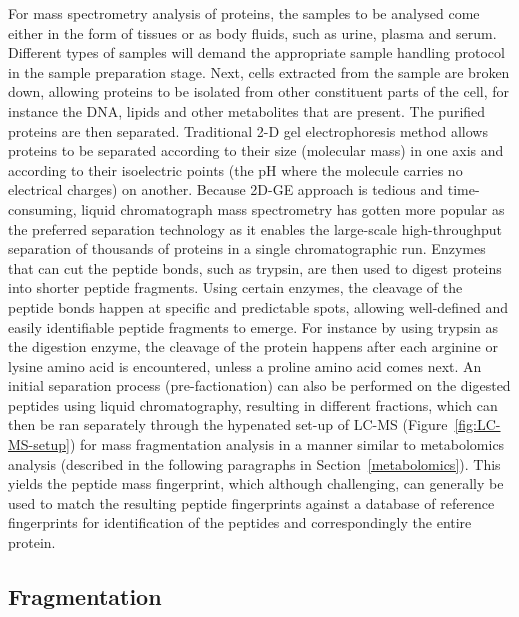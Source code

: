 For mass spectrometry analysis of proteins, the samples to be analysed come either in the form of tissues or as body fluids, such as urine, plasma and serum. Different types of samples will demand the appropriate sample handling protocol in the sample preparation stage. Next, cells extracted from the sample are broken down, allowing proteins to be isolated from other constituent parts of the cell, for instance the DNA, lipids and other metabolites that are present. The purified proteins are then separated. Traditional 2-D gel electrophoresis method allows proteins to be separated according to their size (molecular mass) in one axis and according to their isoelectric points (the pH where the molecule carries no electrical charges) on another. Because 2D-GE approach is tedious and time-consuming, liquid chromatograph mass spectrometry has gotten more popular as the preferred separation technology as it enables the large-scale high-throughput separation of thousands of proteins in a single chromatographic run. Enzymes that can cut the peptide bonds, such as trypsin, are then used to digest proteins into shorter peptide fragments. Using certain enzymes, the cleavage of the peptide bonds happen at specific and predictable spots, allowing well-defined and easily identifiable peptide fragments to emerge. For instance by using trypsin as the digestion enzyme, the cleavage of the protein happens after each arginine or lysine amino acid is encountered, unless a proline amino acid comes next. An initial separation process (pre-factionation) can also be performed on the digested peptides using liquid chromatography, resulting in different fractions, which can then be ran separately through the hypenated set-up of LC-MS (Figure~\ref{fig:LC-MS-setup}) for mass fragmentation analysis in a manner similar to metabolomics analysis (described in the following paragraphs in Section~\ref{metabolomics}). This yields the peptide mass fingerprint, which although challenging, can generally be used to match the resulting peptide fingerprints against a database of reference fingerprints for identification of the peptides and correspondingly the entire protein. 

\subsection{Fragmentation}

